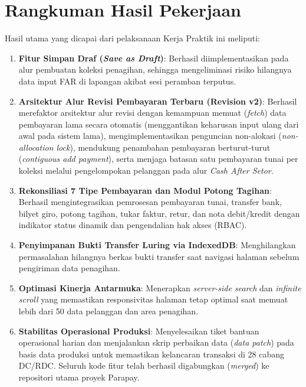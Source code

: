 \section{Rangkuman Hasil Pekerjaan}
Hasil utama yang dicapai dari pelaksanaan Kerja Praktik ini meliputi:
\begin{enumerate}[label=\arabic*)]
  \item \textbf{Fitur Simpan Draf (\textit{Save as Draft})}: Berhasil diimplementasikan pada alur pembuatan koleksi penagihan, sehingga mengeliminasi risiko hilangnya data input FAR di lapangan akibat sesi peramban terputus.
  \item \textbf{Arsitektur Alur Revisi Pembayaran Terbaru (Revision v2)}: Berhasil merefaktor arsitektur alur revisi dengan kemampuan memuat (\textit{fetch}) data pembayaran lama secara otomatis (menggantikan keharusan input ulang dari awal pada sistem lama), mengimplementasikan penguncian non-alokasi (\textit{non-allocation lock}), mendukung penambahan pembayaran berturut-turut (\textit{contiguous add payment}), serta menjaga batasan satu pembayaran tunai per koleksi melalui pengelompokan pelanggan pada alur \textit{Cash After Setor}.
  \item \textbf{Rekonsiliasi 7 Tipe Pembayaran dan Modul Potong Tagihan}: Berhasil mengintegrasikan pemrosesan pembayaran tunai, transfer bank, bilyet giro, potong tagihan, tukar faktur, retur, dan nota debit/kredit dengan indikator status dinamik dan pengendalian hak akses (RBAC).
  \item \textbf{Penyimpanan Bukti Transfer Luring via IndexedDB}: Menghilangkan permasalahan hilangnya berkas bukti transfer saat navigasi halaman sebelum pengiriman data penagihan.
  \item \textbf{Optimasi Kinerja Antarmuka}: Menerapkan \textit{server-side search} dan \textit{infinite scroll} yang memastikan responsivitas halaman tetap optimal saat memuat lebih dari 50 data pelanggan dan area penagihan.
  \item \textbf{Stabilitas Operasional Produksi}: Menyelesaikan tiket bantuan operasional harian dan menjalankan skrip perbaikan data (\textit{data patch}) pada basis data produksi untuk memastikan kelancaran transaksi di 28 cabang DC/RDC. Seluruh kode fitur telah berhasil digabungkan (\textit{merged}) ke repositori utama proyek Parapay.
\end{enumerate}

